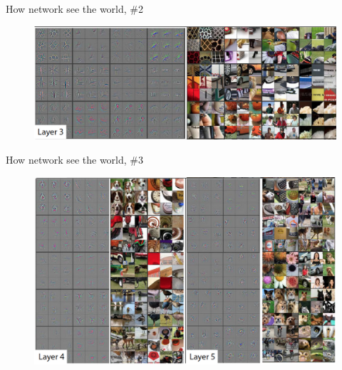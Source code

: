 \documentclass{beamer}
\begin{document}
\begin{frame}{How network see the world, \#2}

\begin{figure}[h!]
  \centering
  \includegraphics[width=1\textwidth]{images/features2.png}
\end{figure}

\end{frame}


\begin{frame}{How network see the world, \#3}

\begin{figure}[h!]
  \centering
  \includegraphics[width=1\textwidth]{images/features3.png}
\end{figure}

\end{frame}
\end{document}
